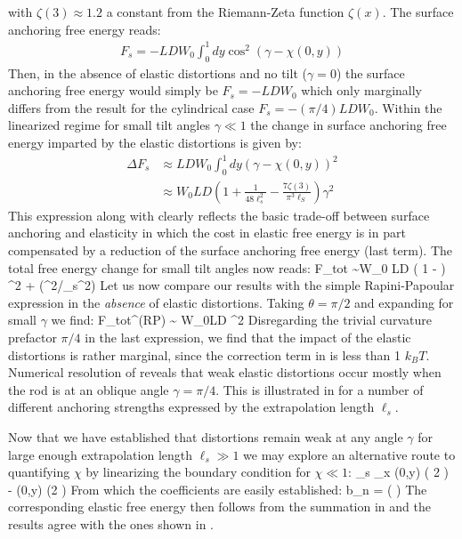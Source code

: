 with $\zeta(3) \approx 1.2 $ a constant from the Riemann-Zeta function $\zeta(x)$. The surface anchoring free energy reads:
\begin{align}
F_{s} = - LDW_{0} \int_{0}^{1} dy \cos^{2} (\gamma - \chi(0,y))
\end{align}
Then, in the absence of elastic distortions and no tilt ($\gamma = 0$) the surface anchoring free energy would simply be $F_{s} = -LDW_{0}$ which only marginally differs from the result for the cylindrical case $F_{s} = -(\pi/4)LDW_{0}$.
Within the linearized regime for small tilt angles $\gamma \ll 1$  the change in surface anchoring free energy imparted by the elastic distortions is given by:
\begin{align}
\Delta F_{s} &\approx LDW_{0}  \int_{0}^{1} dy  (\gamma - \chi(0,y))^{2}  \nonumber \\
& \approx W_{0} LD  \left ( 1 + \frac{1}{48 \ell_{s}^{2}} - \frac{7  \zeta(3)}{ \pi^{3} \ell_{S}} \right) \gamma^{2}
\end{align}
This expression along with  clearly reflects the basic trade-off between surface anchoring and elasticity in which the cost in elastic free energy is in part compensated by a reduction of the surface anchoring free energy (last term). The total free energy change for small tilt angles now reads:
\beq
\Delta  F_{\rm tot} \sim  W_{0} LD \left ( 1  -   \right ) \gamma^{2} + (\gamma^{2}/\ell_{s}^{2})
\label{ftiltcorr}
\eeq
Let us now compare our results with the simple Rapini-Papoular expression  in the {\em absence} of elastic distortions. Taking $\theta=\pi/2$ and expanding for small $\gamma $ we find:
 \beq
 \Delta  F_{\rm tot}^{(RP)} \sim {} W_{0}LD \gamma^{2}
\eeq
Disregarding the trivial curvature prefactor $\pi/4$ in the last expression, we find that the impact of the elastic distortions is rather marginal, since the correction term in   is less than 1 $k_{B}T$. Numerical resolution of  reveals that weak elastic distortions  occur mostly when the rod is at an oblique angle $\gamma = \pi/4$.
This is illustrated in  for a number of different anchoring strengths expressed by the extrapolation length $\ell_{s}$.

Now that we have established that distortions remain weak at any angle $\gamma$ for large enough extrapolation length $\ell_{s}  \gg 1$ we may explore an alternative route to quantifying $\chi$ by linearizing the boundary condition  for $\chi \ll 1$:
\beq
\ell_{s} \partial_{x} \chi(0,y)\approx {} \sin ( 2 \gamma) - \chi(0,y) \cos (2 \gamma )
\label{bcweak}
\eeq
From which the coefficients are easily established:
\beq
b_{n}  =  \left ( \right )
\eeq
The corresponding elastic free energy then follows from the summation in  and the results agree with the ones shown in .





